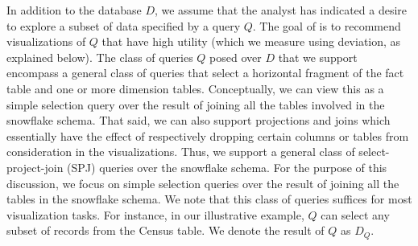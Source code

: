 In addition to the database $D$, we assume that the analyst has indicated
a desire to explore a subset of data specified by a query $Q$.
The goal of \SeeDB is to recommend visualizations of $Q$ that have
high utility (which we measure using deviation, as explained below).
The class of queries $Q$ posed over $D$ that we support encompass a general class of queries 
that select a horizontal fragment of the fact table and one or more dimension tables.
Conceptually, we can view this as a simple selection query over the result of joining all
the tables involved in the snowflake schema. 
That said, we can also support projections and joins which essentially have the effect
of respectively dropping certain columns or tables from consideration in the visualizations.
Thus, we support a general class of select-project-join (SPJ) queries over the snowflake schema.
For the purpose of this discussion, we focus on simple selection
queries over the result of joining all the tables in the snowflake schema.
We note that this class of queries 
suffices for most visualization tasks.
For instance, in our illustrative example, $Q$ can select any subset of records from the
Census table. 
We denote the result of $Q$ as $D_Q$.

